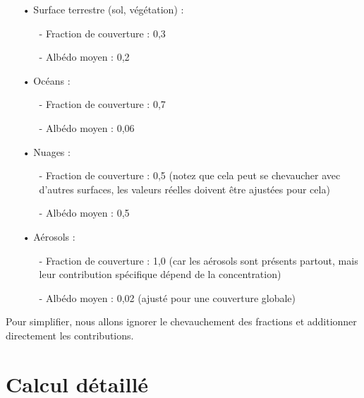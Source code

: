 \documentclass[a4paper,11pt]{article}
\begin{document}
\begin{enumerate}

\item[•] Surface terrestre (sol, végétation) :
\begin{enumerate}

\item[-] Fraction de couverture : 0,3
\item[-] Albédo moyen : 0,2

\end{enumerate}

\item[•] Océans :
\begin{enumerate}

\item[-] Fraction de couverture : 0,7
\item[-] Albédo moyen : 0,06

\end{enumerate}

\item[•] Nuages :
\begin{enumerate}

\item[-] Fraction de couverture : 0,5 (notez que cela peut se chevaucher avec d'autres surfaces, les valeurs réelles doivent être ajustées pour cela)
\item[-] Albédo moyen : 0,5

\end{enumerate}

\item[•] Aérosols :
\begin{enumerate}

\item[-] Fraction de couverture : 1,0 (car les aérosols sont présents partout, mais leur contribution spécifique dépend de la concentration)
\item[-] Albédo moyen : 0,02 (ajusté pour une couverture globale)

\end{enumerate}

\end{enumerate}


Pour simplifier, nous allons ignorer le chevauchement des fractions et additionner directement les contributions.


\section{Calcul détaillé}
\end{document}
